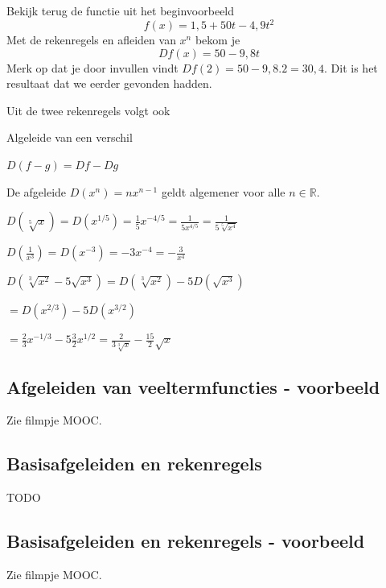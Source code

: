 \begin{voorbeeld}
	Bekijk terug de functie uit het beginvoorbeeld
	\[
	f(x)=1,5+50t-4,9t^2
	\]
	Met de rekenregels en afleiden van $x^n$ bekom je
	\[
	Df(x)=50-9,8t
	\]
	Merk op dat je door invullen vindt $Df(2)=50-9,8.2=30,4$.
	Dit is het resultaat dat we eerder gevonden hadden.
\end{voorbeeld}

Uit de twee rekenregels volgt ook
\begin{eigenschap} Algeleide van een verschil
	
	$\boxed {D(f-g)=Df-Dg}$
\end{eigenschap}\vspace{5 mm}
\begin{eigenschap}
	De afgeleide $D(x^n)=nx^{n-1}$ geldt algemener voor alle $n\in \mathbb{R}$.
\end{eigenschap}

\begin{voorbeeld}
	$D(\sqrt[5]{x})=D(x^{1/5})=\frac{1}{5}x^{-4/5}=\frac{1}{5x^{4/5}}=\frac{1}{5\sqrt[5]{x^4}}$
\end{voorbeeld}

\begin{voorbeeld}
	$D(\frac{1}{x^3})=D(x^{-3})=-3x^{-4}=-\frac{3}{x^4}$
\end{voorbeeld}

\begin{voorbeeld}
	$D(\sqrt[3]{x^2}-5\sqrt{x^3})=D(\sqrt[3]{x^2})-5D(\sqrt{x^3})$
	
	\hspace{5mm} $=D(x^{2/3})-5D(x^{3/2})$
	
	\hspace{5mm} $=\frac{2}{3}x^{-1/3}-5\frac{3}{2}x^{1/2}=\frac{2}{3\sqrt[3]{x}}-\frac{15}{2}\sqrt{x}$
\end{voorbeeld}

\subsection{Afgeleiden van veeltermfuncties - voorbeeld}

Zie filmpje MOOC.

\subsection{Basisafgeleiden en rekenregels}
TODO

\subsection{Basisafgeleiden en rekenregels - voorbeeld}
Zie filmpje MOOC.

